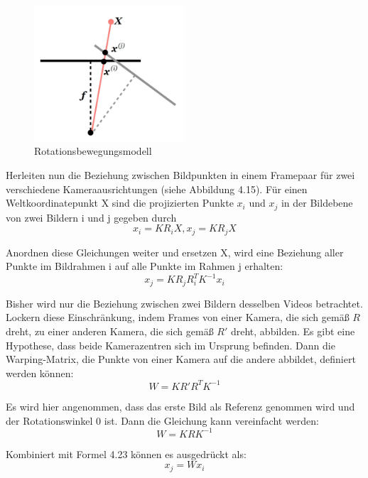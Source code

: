 \begin{figure}[htb]
 \centering 
 \includegraphics[keepaspectratio,width=0.5\textwidth]{images/4_ZweiteErfahrung/Kamera/rotationsmodel.pdf}
 \caption{Rotationsbewegungsmodell}
 \label{fig:rotationsmodel}
\end{figure} 


Herleiten nun die Beziehung zwischen Bildpunkten in einem Framepaar für zwei verschiedene Kameraausrichtungen (siehe Abbildung 4.15). Für einen Weltkoordinatepunkt X sind die projizierten Punkte $x_i$ und $x_j$ in der Bildebene von zwei Bildern i und j gegeben durch
\begin{equation}
   x_i = KR_iX, x_j = KR_jX
\end{equation}

Anordnen diese Gleichungen weiter und ersetzen X, wird eine Beziehung aller Punkte im Bildrahmen i auf alle Punkte im Rahmen j erhalten:
\begin{equation}
   x_j = KR_jR_i^TK^{-1}x_i
\end{equation}

Bisher wird nur die Beziehung zwischen zwei Bildern desselben Videos betrachtet. Lockern diese Einschränkung, indem Frames von einer Kamera, die sich gemäß $R$ dreht, zu einer anderen Kamera, die sich gemäß $R'$ dreht, abbilden. Es gibt eine Hypothese, dass beide Kamerazentren sich im Ursprung befinden. Dann die Warping-Matrix, die Punkte von einer Kamera auf die andere abbildet, definiert werden können:
\begin{equation}
   W = KR'R^TK^{-1}
\end{equation}

Es wird hier angenommen, dass das erste Bild als Referenz genommen wird und der Rotationswinkel 0 ist. Dann die Gleichung kann vereinfacht werden:
\begin{equation}
   W = KRK^{-1}
\end{equation}

Kombiniert mit Formel 4.23 können es ausgedrückt als:
\begin{equation}
   x_j = Wx_i
\end{equation}


